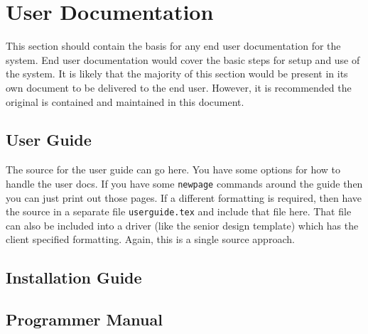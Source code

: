 
\chapter{User Documentation}

This section should contain the basis for any end user documentation for the system. 
 End user documentation would cover the basic steps for setup and use of the system. 
 It is likely that the majority of this section would be present in its own document 
to be delivered to the end user.  However, it is recommended the original is contained 
and maintained in this document. 


\section{User Guide}

The source for the user guide can go here.    You have some options for how to handle the user docs.  If you have some {\tt newpage} commands around the guide then you can just print out those pages.   If a different formatting is required, then have the source in a separate file {\tt userguide.tex} and include that file here.  That file can also be included into a driver (like the senior design template) which has the client specified formatting.  Again, this is a single source approach.   


\section{Installation Guide}


\section{Programmer Manual}


